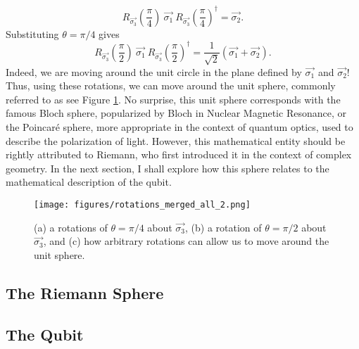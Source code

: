 $$ R_{\vec{\sigma_3}} \left( \frac{\pi}{4} \right) \ \vec{\sigma_1}  \ R_{\vec{\sigma_3}} \left(  \frac{\pi}{4} \right)^\dagger =  \vec{\sigma_2}. $$
Substituting $\theta = \pi/4$ gives
$$ R_{\vec{\sigma_3}} \left( \frac{\pi}{2} \right) \ \vec{\sigma_1}  \ R_{\vec{\sigma_3}} \left(  \frac{\pi}{2} \right)^\dagger =  \frac{1}{\sqrt{2}} \left( \vec{\sigma_1} + \vec{\sigma_2} \right). $$
Indeed, we are moving around the unit circle in the plane defined by $\vec{\sigma_1}$ and $\vec{\sigma_2}$! Thus, using these rotations, we can move around the unit sphere, commonly referred to as see Figure \ref{fig:riemann_sphere}. No surprise, this unit sphere corresponds with the famous Bloch sphere, popularized by Bloch in Nuclear Magnetic Resonance, or the Poincaré sphere, more appropriate in the context of quantum optics, used to describe the polarization of light. However, this mathematical entity should be rightly attributed to Riemann, who first introduced it in the context of complex geometry. In the next section, I shall explore how this sphere relates to the mathematical description of the qubit.

\begin{figure}[H]
   \centering
   \texttt{[image: figures/rotations\_merged\_all\_2.png]}
   \caption{ (a) a rotations of $\theta = \pi/4$ about $\vec{\sigma_3}$, (b) a rotation of $\theta = \pi/2$ about $\vec{\sigma_3}$, and (c) how arbitrary rotations can allow us to move around the unit sphere.}
   \label{fig:riemann_sphere}
\end{figure}


\subsection{The Riemann Sphere}

\subsection{The Qubit}

